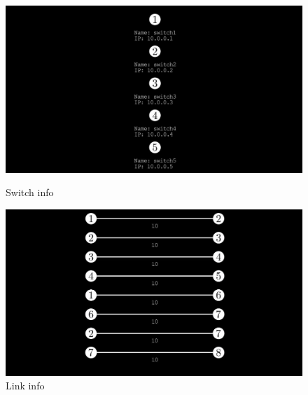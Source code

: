 \documentclass[binding=0.6cm]{sapthesis}
\begin{document}
\begin{figure}[ht]
    \centering
    \begin{minipage}{0.48\textwidth}
      \includegraphics[width=\linewidth]{immagini/switch_info.JPG}
      \caption{Switch info}
      \label{fig:switch_info}
    \end{minipage}\hfill
    \begin{minipage}{0.48\textwidth}
      \includegraphics[width=\linewidth]{immagini/links_info.JPG}
      \caption{Link info}
      \label{fig:links_info}
    \end{minipage}
\end{figure}
\end{document}
